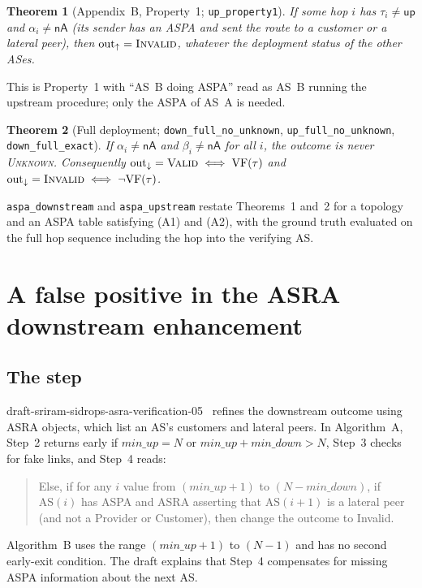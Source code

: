 \documentclass[11pt,a4paper]{article}
\newtheorem{theorem}{Theorem}
\theoremstyle{definition}
\theoremstyle{remark}
\newcommand{\AS}{\mathrm{AS}}
\newcommand{\nA}{\mathsf{nA}}     %
\newcommand{\up}{\mathsf{up}}
\newcommand{\Valid}{\textup{\textsc{Valid}}}
\newcommand{\Invalid}{\textup{\textsc{Invalid}}}
\newcommand{\Unknown}{\textup{\textsc{Unknown}}}
\newcommand{\minup}{\mathit{min\_up}}
\newcommand{\mindown}{\mathit{min\_down}}
\newcommand{\VF}{\mathrm{VF}}
\newcommand{\lean}[1]{\texttt{#1}}
\begin{document}
\begin{theorem}[Appendix~B, Property~1; \lean{up\_property1}]
If some hop $i$ has $\tau_i\neq\up$ and $\alpha_i\neq\nA$ (its sender has an ASPA and sent the route
to a customer or a lateral peer), then $\mathrm{out}_{\uparrow}=\Invalid$, whatever the deployment status
of the other ASes.
\end{theorem}
\noindent This is Property~1 with ``AS~B doing ASPA'' read as AS~B running the upstream procedure; only
the ASPA of AS~A is needed.

\begin{theorem}[Full deployment; \lean{down\_full\_no\_unknown}, \lean{up\_full\_no\_unknown},\\ \lean{down\_full\_exact}]
If $\alpha_i\neq\nA$ and $\beta_i\neq\nA$ for all $i$, the outcome is never \Unknown. Consequently
$\mathrm{out}_{\downarrow}=\Valid\iff\VF(\tau)$ and $\mathrm{out}_{\downarrow}=\Invalid\iff\neg\VF(\tau)$.
\end{theorem}

\noindent\lean{aspa\_downstream} and \lean{aspa\_upstream} restate Theorems~1 and~2 for a topology and an
ASPA table satisfying (A1) and (A2), with the ground truth evaluated on the full hop sequence including the
hop into the verifying AS.

\section{A false positive in the ASRA downstream enhancement}
\label{sec:asra}

\subsection{The step}
draft-sriram-sidrops-asra-verification-05~\cite{asra} refines the downstream outcome using ASRA objects,
which list an AS's customers and lateral peers. In Algorithm~A, Step~2 returns early if $\minup=N$ or
$\minup+\mindown>N$, Step~3 checks for fake links, and Step~4 reads:
\begin{quote}\small
Else, if for any $i$ value from $(\minup+1)$ to $(N-\mindown)$, if $\AS(i)$ has ASPA and ASRA asserting
that $\AS(i+1)$ is a lateral peer (and not a Provider or Customer), then change the outcome to Invalid.
\end{quote}
Algorithm~B uses the range $(\minup+1)$ to $(N-1)$ and has no second early-exit condition. The draft
explains that Step~4 compensates for missing ASPA information about the next AS.
\end{document}
